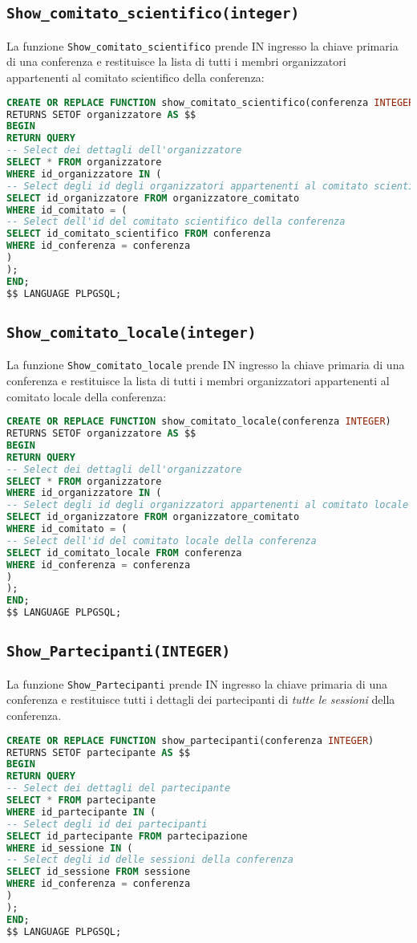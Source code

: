 \subsection{\texttt{Show\_comitato\_scientifico(integer)}}
La funzione \texttt{Show\_comitato\_scientifico} prende IN ingresso la chiave primaria di una conferenza e restituisce la lista di tutti i membri organizzatori appartenenti al comitato scientifico della conferenza:
\begin{lstlisting}[language=SQL, style=mystyle]
CREATE OR REPLACE FUNCTION show_comitato_scientifico(conferenza INTEGER)
RETURNS SETOF organizzatore AS $$
BEGIN
RETURN QUERY
-- Select dei dettagli dell'organizzatore
SELECT * FROM organizzatore
WHERE id_organizzatore IN (
-- Select degli id degli organizzatori appartenenti al comitato scientifico
SELECT id_organizzatore FROM organizzatore_comitato
WHERE id_comitato = (
-- Select dell'id del comitato scientifico della conferenza
SELECT id_comitato_scientifico FROM conferenza
WHERE id_conferenza = conferenza
)
);
END;
$$ LANGUAGE PLPGSQL;
\end{lstlisting}
\subsection{\texttt{Show\_comitato\_locale(integer)}}
La funzione \texttt{Show\_comitato\_locale} prende IN ingresso la chiave primaria di una conferenza e restituisce la lista di tutti i membri organizzatori appartenenti al comitato locale della conferenza:
\begin{lstlisting}[language=SQL, style=mystyle]
CREATE OR REPLACE FUNCTION show_comitato_locale(conferenza INTEGER)
RETURNS SETOF organizzatore AS $$
BEGIN
RETURN QUERY
-- Select dei dettagli dell'organizzatore
SELECT * FROM organizzatore
WHERE id_organizzatore IN (
-- Select degli id degli organizzatori appartenenti al comitato locale
SELECT id_organizzatore FROM organizzatore_comitato
WHERE id_comitato = (
-- Select dell'id del comitato locale della conferenza
SELECT id_comitato_locale FROM conferenza
WHERE id_conferenza = conferenza
)
);
END;
$$ LANGUAGE PLPGSQL;
\end{lstlisting}
\subsection{\texttt{Show\_Partecipanti(INTEGER)}}
La funzione \texttt{Show\_Partecipanti} prende IN ingresso la chiave primaria di una conferenza e restituisce tutti i dettagli dei partecipanti di \textit{tutte le sessioni} della conferenza.
\begin{lstlisting}[language=SQL,style=mystyle]
CREATE OR REPLACE FUNCTION show_partecipanti(conferenza INTEGER)
RETURNS SETOF partecipante AS $$
BEGIN
RETURN QUERY
-- Select dei dettagli del partecipante
SELECT * FROM partecipante
WHERE id_partecipante IN (
-- Select degli id dei partecipanti
SELECT id_partecipante FROM partecipazione
WHERE id_sessione IN (
-- Select degli id delle sessioni della conferenza
SELECT id_sessione FROM sessione
WHERE id_conferenza = conferenza
)
);
END;
$$ LANGUAGE PLPGSQL;
\end{lstlisting}
